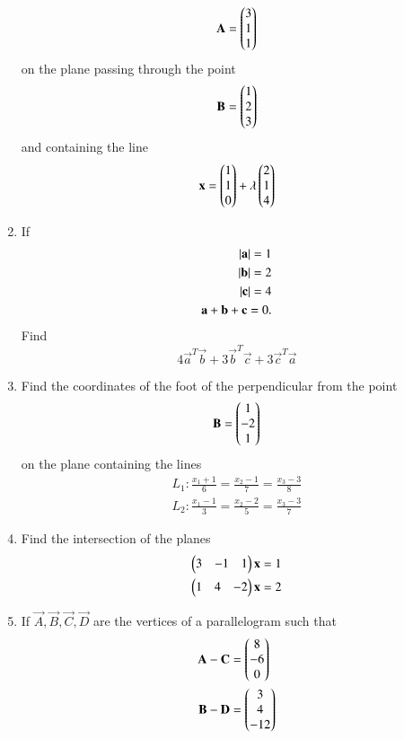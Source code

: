 \documentclass[journal,12pt,twocolumn]{IEEEtran}
\begin{document}
\begin{enumerate}[label=\arabic*.]
\begin{equation}
\mathbf{A}=\begin{pmatrix}3 \\ 1 \\ 1\end{pmatrix}
\end{equation}
%
on the plane passing through the point
\begin{equation}
\mathbf{B}=\begin{pmatrix}1 \\ 2 \\ 3\end{pmatrix}
\end{equation}
%
and containing the line
\begin{equation}
\mathbf{x}=\begin{pmatrix}1 \\ 1 \\ 0\end{pmatrix}+\lambda\begin{pmatrix}2 \\ 1 \\ 4\end{pmatrix}
\end{equation}
%
\item If 
\begin{align}
\left\vert\mathbf{a}\right\vert=1
\\
\left\vert\mathbf{b}\right\vert=2
\\
\left\vert\mathbf{c}\right\vert=4
\\
\mathbf{a}+\mathbf{b}+\mathbf{c}=0.
\end{align}
Find
\begin{equation}
4\vec{a}^T\vec{b}+3\vec{b}^T\vec{c}+3\vec{c}^T\vec{a}
\end{equation}
\item Find the coordinates of the foot of the perpendicular from the point
\begin{equation}
\mathbf{B}=\begin{pmatrix}1 \\ -2 \\ 1\end{pmatrix}
\end{equation}
%
on the plane containing the lines
\begin{align}
L_1:\frac{x_1+1}{6}=
\frac{x_2-1}{7} = 
\frac{x_3-3}{8}
\\
L_2:\frac{x_1-1}{3}=
\frac{x_2-2}{5} = 
\frac{x_3-3}{7}
\end{align}
%
\item Find the intersection of the planes
\begin{align}
\begin{pmatrix}3 & -1 & 1\end{pmatrix}\mathbf{x} &= 1
\\
\begin{pmatrix}1 & 4 & -2\end{pmatrix}\mathbf{x} &= 2
\end{align}
%
\item If $\vec{A},\vec{B},\vec{C},\vec{D}$ are the vertices of a parallelogram such that
\begin{align}
\vec{A}-\vec{C}&=\myvec{8 \\ -6 \\ 0}
\\
\vec{B}-\vec{D}&=\myvec{3 \\ 4 \\ -12}

\end{align}
\end{enumerate}
\end{document}
